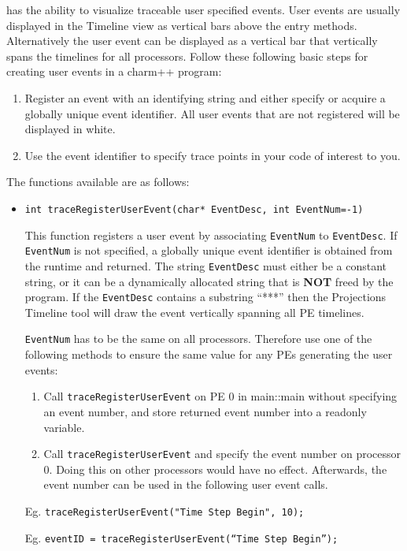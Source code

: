 \projections{} has the ability to visualize traceable user
specified events. User events are usually displayed in the Timeline view as vertical bars above the entry methods. Alternatively the user event can be displayed as a vertical bar that vertically spans the timelines for all processors. Follow these following basic steps for creating user events in a charm++ program:

\begin{enumerate}
\item
Register an event with an identifying string and either specify or acquire
a globally unique event identifier. All user events that are not registered will be displayed in white.

\item
Use the event identifier to specify trace points in your code of interest to you.
\end{enumerate}

The functions available are as follows:

\begin{itemize}
\item
{\tt int traceRegisterUserEvent(char* EventDesc, int EventNum=-1) }

This function registers a user event by associating {\tt EventNum} to
{\tt EventDesc}. If {\tt EventNum} is not specified, a globally unique
event identifier is obtained from the runtime and returned. The string {\tt EventDesc} must either be a constant string, or it can be a dynamically allocated string that is {\bf NOT} freed by the program. If the {\tt EventDesc} contains a substring ``***'' then the Projections Timeline tool will draw the event vertically spanning all PE timelines.

{\tt EventNum} has to be the same on all processors. Therefore use one of the following methods to ensure the same value for any PEs generating the user events:

\begin{enumerate}
\item
Call {\tt traceRegisterUserEvent} on PE 0 in main::main without specifying
an event number, and store returned event number into a readonly variable.
\item
Call {\tt traceRegisterUserEvent} and specify the event number on
processor 0. Doing this on other processors would have no
effect. Afterwards, the event number can be used in the following user
event calls.
\end{enumerate}

Eg. {\tt traceRegisterUserEvent("Time Step Begin", 10);}

Eg. {\tt eventID = traceRegisterUserEvent(``Time Step Begin'');}

\end{itemize}



